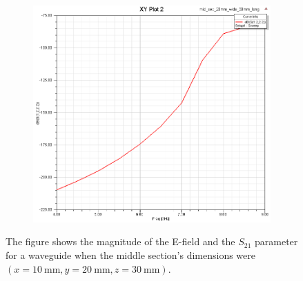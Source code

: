 \documentclass[12pt,a4paper]{article}
\begin{document}
\begin{figure}
\begin{subfigure}[b]{0.49\textwidth}
    \label{fig:2_2030_9ghz}
  \end{subfigure}
  \begin{subfigure}[b]{0.49\textwidth}
    \includegraphics[width=\textwidth]{./mid_sec_20mm_wide_30mm_long/s1222.png}
    \label{fig:2_2030_s1222}
  \end{subfigure}
  \caption{The figure shows the magnitude of the E-field and the $S_{21}$ parameter for a waveguide when the middle section's dimensions were $(x=\SI{10}{\milli\metre}, y=\SI{20}{\milli\metre}, z=\SI{30}{\milli\metre})$.}
  \label{fig:task2_2030}
\end{figure}
\end{document}
